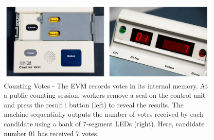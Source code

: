 \documentclass{article}
\begin{document}
\begin{figure}[h!]
\includegraphics[width=1\textwidth]{evm2.png}
\centering
\caption{Counting Votes - The EVM records votes in its internal memory. At a public counting session, workers remove a seal on the control unit and press the result i button (left) to reveal the results. The machine sequentially outputs the number of votes received by each candidate using a bank of 7-segment LEDs (right). Here, candidate number 01 has received 7 votes.}
\end{figure}
\end{document}
